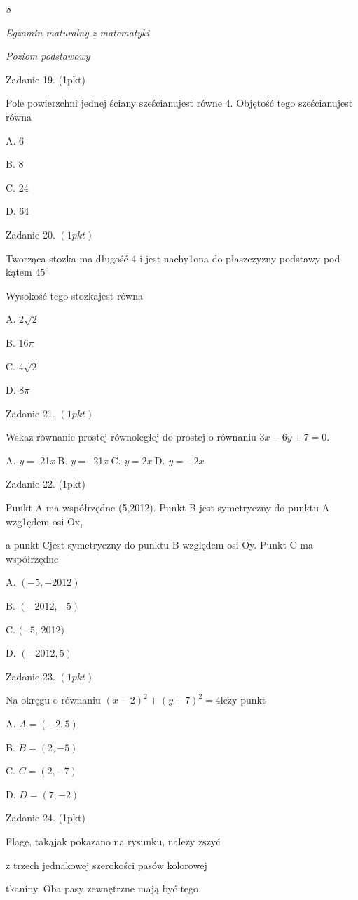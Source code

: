 \documentclass[a4paper,12pt]{article}
\begin{document}
{\it 8}

{\it Egzamin maturalny z matematyki}

{\it Poziom podstawowy}

Zadanie 19. (1pkt)

Pole powierzchni jednej ściany sześcianujest równe 4. Objętość tego sześcianujest równa

A. 6

B. 8

C. 24

D. 64

Zadanie 20. $(1pkt)$

Tworząca stozka ma długość 4 i jest nachy1ona do płaszczyzny podstawy pod kątem $45^{\mathrm{o}}$

Wysokość tego stozkajest równa

A. $2\sqrt{2}$

B. $ 16\pi$

C. $4\sqrt{2}$

D. $ 8\pi$

Zadanie 21. $(1pkt)$

Wskaz równanie prostej równoległej do prostej o równaniu $3x-6y+7=0.$

A. {\it y}$=$-21{\it x} B. {\it y}$=$--21{\it x} C. {\it y}$=$2{\it x} D. {\it y}$=- 2x$

Zadanie 22. (1pkt)

Punkt A ma współrzędne (5,2012). Punkt B jest symetryczny do punktu A wzg1ędem osi Ox,

a punkt Cjest symetryczny do punktu B względem osi Oy. Punkt C ma współrzędne

A. $(-5,-2012)$

B. $(-2012,-5)$

C. $(-5$, 2012$)$

D. $(-2012,5)$

Zadanie 23. $(1pkt)$

Na okręgu o równaniu $(x-2)^{2}+(y+7)^{2}=4\mathrm{l}\mathrm{e}\dot{\mathrm{z}}\mathrm{y}$ punkt

A. $A=(-2,5)$

B. $B=(2,-5)$

C. $C=(2,-7)$

D. $D=(7,-2)$

Zadanie 24. (1pkt)

Flagę, takąjak pokazano na rysunku, nalezy zszyć

z trzech jednakowej szerokości pasów kolorowej

tkaniny. Oba pasy zewnętrzne mają być tego
\end{document}
